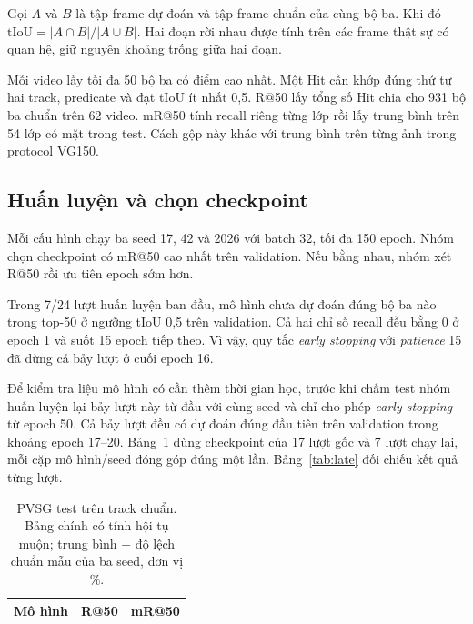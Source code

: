 Gọi $A$ và $B$ là tập frame dự đoán và tập frame chuẩn của cùng bộ ba.
Khi đó $\mathrm{tIoU}=|A\cap B|/|A\cup B|$. Hai đoạn rời nhau được tính trên
các frame thật sự có quan hệ, giữ nguyên khoảng trống giữa hai đoạn.

Mỗi video lấy tối đa 50 bộ ba có điểm cao nhất. Một Hit cần khớp
đúng thứ tự hai track, predicate và đạt tIoU ít nhất 0,5. R@50 lấy tổng
số Hit chia cho 931 bộ ba chuẩn trên 62 video. mR@50 tính recall riêng
từng lớp rồi lấy trung bình trên 54 lớp có mặt trong test. Cách gộp này khác
với trung bình trên từng ảnh trong protocol VG150.

\subsection{Huấn luyện và chọn checkpoint}
Mỗi cấu hình chạy ba seed 17, 42 và 2026 với batch 32, tối đa 150 epoch.
Nhóm chọn checkpoint có mR@50 cao nhất trên validation. Nếu bằng nhau,
nhóm xét R@50 rồi ưu tiên epoch sớm hơn.

Trong 7/24 lượt huấn luyện ban đầu, mô hình chưa dự đoán đúng bộ ba nào
trong top-50 ở ngưỡng tIoU 0,5 trên validation. Cả hai chỉ số recall đều
bằng 0 ở epoch 1 và suốt 15 epoch tiếp theo. Vì vậy, quy tắc
\textit{early stopping} với \textit{patience} 15 đã dừng cả bảy lượt ở cuối epoch 16.

Để kiểm tra liệu mô hình có cần thêm thời gian học, trước khi chấm test
nhóm huấn luyện lại bảy lượt này từ đầu với cùng seed và chỉ cho phép
\textit{early stopping} từ epoch 50. Cả bảy lượt đều có dự đoán đúng đầu tiên
trên validation trong khoảng epoch 17--20. Bảng~\ref{tab:pvsg} dùng checkpoint
của 17 lượt gốc và 7 lượt chạy lại, mỗi cặp mô hình/seed đóng góp đúng một lần.
Bảng~\ref{tab:late} đối chiếu kết quả từng lượt.

\begin{table}[!ht]\centering
\caption{PVSG test trên track chuẩn. Bảng chính có tính hội tụ muộn;
trung bình $\pm$ độ lệch chuẩn mẫu của ba seed, đơn vị \%.}\label{tab:pvsg}
\small\setlength{\tabcolsep}{3pt}
\begin{tabular}{@{}lrr@{}}\toprule
Mô hình & R@50 & mR@50\\\midrule

\end{tabular}
\end{table}

